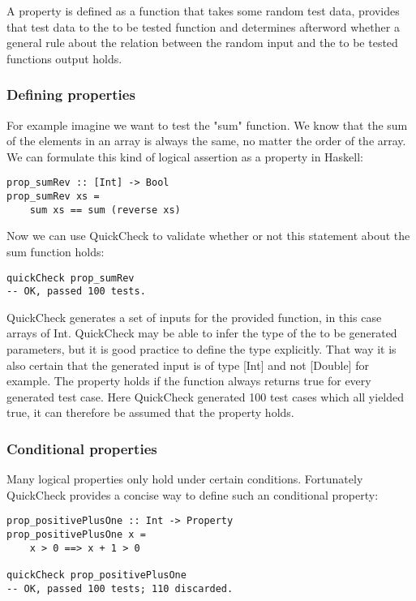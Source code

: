 \documentclass[a4paper, 12pt]{article} %
\begin{document}
A property is defined as a function that takes some random test data, provides that test data to the to be tested function and determines afterword whether a general rule about the relation between the random input and the to be tested functions output holds.

\subsubsection{Defining properties}

For example imagine we want to test the "sum" function. We know that the sum of the elements in an array is always the same, no matter the order of the array. We can formulate this kind of logical assertion as a property in Haskell:

\begin{verbatim}
prop_sumRev :: [Int] -> Bool
prop_sumRev xs = 
    sum xs == sum (reverse xs)
\end{verbatim}

Now we can use QuickCheck to validate whether or not this statement about the sum function holds:

\begin{verbatim}
quickCheck prop_sumRev
-- OK, passed 100 tests.
\end{verbatim}

QuickCheck generates a set of inputs for the provided function, in this case arrays of Int. QuickCheck may be able to infer the type of the to be generated parameters, but it is good practice to define the type explicitly. That way it is also certain that the generated input is of type [Int] and not [Double] for example. The property holds if the function always returns true for every generated test case. \cite{Claessen2000} Here QuickCheck generated 100 test cases which all yielded true, it can therefore be assumed that the property holds.

\subsubsection{Conditional properties}

Many logical properties only hold under certain conditions. Fortunately QuickCheck provides a concise way to define such an conditional property:

\begin{verbatim}
prop_positivePlusOne :: Int -> Property
prop_positivePlusOne x = 
    x > 0 ==> x + 1 > 0

quickCheck prop_positivePlusOne  
-- OK, passed 100 tests; 110 discarded.
\end{verbatim}
\end{document}
